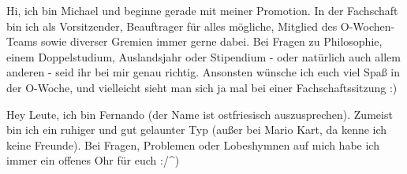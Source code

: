 \begin{multicols*}{2}
{Hi, ich bin Michael und beginne gerade mit meiner Promotion. In der Fachschaft bin ich als Vorsitzender, Beauftrager für alles mögliche, Mitglied des O-Wochen-Teams sowie diverser Gremien immer gerne dabei. Bei Fragen zu Philosophie, einem Doppelstudium, Auslandsjahr oder Stipendium - oder natürlich auch allem anderen - seid ihr bei mir genau richtig. Ansonsten wünsche ich euch viel Spaß in der O-Woche, und vielleicht sieht man sich ja mal bei einer Fachschaftssitzung :)}

{Hey Leute, ich bin Fernando (der Name ist ostfriesisch auszusprechen). Zumeist bin ich ein ruhiger und gut gelaunter Typ (außer bei Mario Kart, da kenne ich keine Freunde). Bei Fragen, Problemen oder Lobeshymnen auf mich habe ich immer ein offenes Ohr für euch :/^)}


\end{multicols*}
